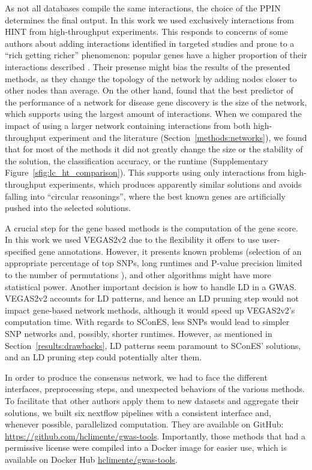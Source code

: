 \documentclass[twocolumn, 11pt]{article}
\begin{document}
As not all databases compile the same interactions, the choice of the PPIN determines the final output. In this work we used exclusively interactions from HINT from high-throughput experiments. This responds to concerns of some authors about adding interactions identified in targeted studies and prone to a ``rich getting richer'' phenomenon: popular genes have a higher proportion of their interactions described \cite{cai_broker_2010,das_hint:_2012}. Their presense might bias the results of the presented methods, as they change the topology of the network by adding nodes closer to other nodes than average. On the other hand, \citet{huang_systematic_2018} found that the best predictor of the performance of a network for disease gene discovery is the size of the network, which supports using the largest amount of interactions. When we compared the impact of using a larger network containing interactions from both high-throughput experiment and the literature (Section~\ref{methods:networks}), we found that for most of the methods it did not greatly change the size or the stability of the solution, the classification accuracy, or the runtime (Supplementary Figure~\ref{sfig:lc_ht_comparison}). This supports using only interactions from high-throughput experiments, which produces apparently similar solutions and avoids falling into ``circular reasonings'', where the best known genes are artificially pushed into the selected solutions. 

A crucial step for the gene based methods is the computation of the gene score. In this work we used VEGAS2v2 \cite{mishra_vegas2:_2015} due to the flexibility it offers to use user-specified gene annotations. However, it presents known problems (selection of an appropriate percentage of top SNPs, long runtimes and P-value precision limited to the number of permutations \cite{nakka_gene_2016}), and other algorithms might have more statistical power. Another important decision is how to handle LD in a GWAS. VEGAS2v2 accounts for LD patterns, and hence an LD pruning step would not impact gene-based network methods, although it would speed up VEGAS2v2's computation time. With regards to SConES, less SNPs would lead to simpler SNP networks and, possibly, shorter runtimes. However, as mentioned in Section~\ref{results:drawbacks}, LD patterns seem paramount to SConES' solutions, and an LD pruning step could potentially alter them. 

In order to produce the consensus network, we had to face the different interfaces, preprocessing steps, and unexpected behaviors of the various methods. To facilitate that other authors apply them to new datasets and aggregate their solutions, we built six nextflow pipelines \cite{di_tommaso_nextflow_2017} with a consistent interface and, whenever possible, parallelized computation. They are available on GitHub: \url{https://github.com/hclimente/gwas-tools}. Importantly, those methods that had a permissive license were compiled into a Docker image for easier use, which is available on Docker Hub \href{https://hub.docker.com/r/hclimente/gwas-tools}{hclimente/gwas-tools}.
\end{document}

